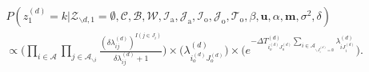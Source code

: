 \documentclass[a4paper]{article}
\begin{document}
  \begin{equation}
  \begin{aligned}
  &P(z^{(d)}_1=k|\mathcal{Z}_{\backslash d, 1}=\emptyset,   \mathcal{C},   \mathcal{B},\mathcal{W}, \mathcal{I}_{\mbox{a}}, \mathcal{J}_{\mbox{a}}, \mathcal{I}_{\mbox{o}}, \mathcal{J}_{\mbox{o}}, \mathcal{T}_{\mbox{o}}, \beta, \boldsymbol{u}, \alpha, \boldsymbol{m}, \sigma^2,  \delta)\\&\propto\Big(\prod_{i\in \mathcal{A}}\prod_{j \in \mathcal{A}_{\backslash i }} \frac{(\delta\lambda^{(d)}_{ij})^{I(j \in J_i)}}{\delta\lambda^{(d)}_{ij}+1}\Big)\times \Big(\lambda^{(d)}_{i_o^{(d)}J_{o}^{(d)}}\Big)\times  \Big(e^{-\Delta T^{(d)}_{i_o^{(d)}J_o^{(d)}}\sum\limits_{i\in \mathcal{A}_{\backslash J^{(d)}_i = \emptyset}}\lambda^{(d)}_{iJ^{(d)}_{i}}}\Big).
  \end{aligned}
  \end{equation}
\end{document}
